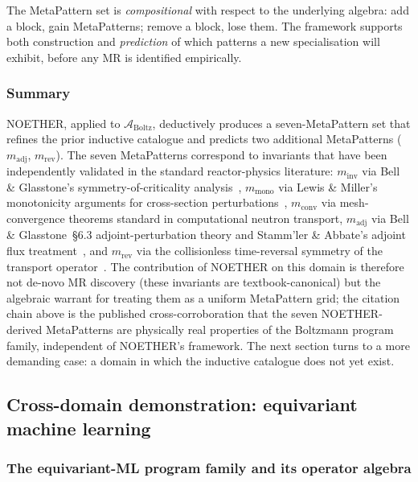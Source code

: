 \documentclass[acmsmall, screen]{acmart}
\begin{document}
The MetaPattern set is \emph{compositional} with respect to the underlying algebra: add a block, gain MetaPatterns; remove a block, lose them. The framework supports both construction and \emph{prediction} of which patterns a new specialisation will exhibit, before any MR is identified empirically.

\subsubsection{Summary}

NOETHER, applied to $\mathcal{A}_{\mathrm{Boltz}}$, deductively produces a seven-MetaPattern set that refines the prior inductive catalogue and predicts two additional MetaPatterns ($m_{\mathrm{adj}}$, $m_{\mathrm{rev}}$). The seven MetaPatterns correspond to invariants that have been independently validated in the standard reactor-physics literature: $m_{\mathrm{inv}}$ via Bell \& Glasstone's symmetry-of-criticality analysis~\cite{BellGlasstone1970}, $m_{\mathrm{mono}}$ via Lewis \& Miller's monotonicity arguments for cross-section perturbations~\cite{LewisMiller1993}, $m_{\mathrm{conv}}$ via mesh-convergence theorems standard in computational neutron transport, $m_{\mathrm{adj}}$ via Bell \& Glasstone~\S6.3 adjoint-perturbation theory and Stamm'ler \& Abbate's adjoint flux treatment~\cite{StammlerAbbate1983}, and $m_{\mathrm{rev}}$ via the collisionless time-reversal symmetry of the transport operator~\cite{LewisMiller1993}. The contribution of NOETHER on this domain is therefore not de-novo MR discovery (these invariants are textbook-canonical) but the algebraic warrant for treating them as a uniform MetaPattern grid; the citation chain above is the published cross-corroboration that the seven NOETHER-derived MetaPatterns are physically real properties of the Boltzmann program family, independent of NOETHER's framework. The next section turns to a more demanding case: a domain in which the inductive catalogue does not yet exist.

\subsection{Cross-domain demonstration: equivariant machine learning}
\label{sec:cross-domain}

\subsubsection{The equivariant-ML program family and its operator algebra}
\end{document}
